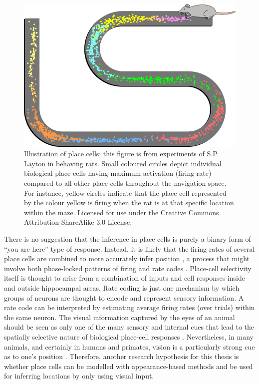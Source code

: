 \begin{figure}[!t]
\centering
\includegraphics[width=.6\linewidth]{./gfx/Chapter01/bio_place_cells_rat.png}
\caption{Illustration of place cells; this figure is from experiments of S.P. Layton in behaving rats. Small coloured circles depict individual biological place-cells having maximum activation (firing rate) compared to all other place cells throughout the navigation space. For instance, yellow circles indicate that the place cell represented by the colour yellow is firing when the rat is at that specific location within the maze. Licensed for use under the Creative Commons Attribution\--Share\-A\-like 3.0 License.}
\label{fig:Maze}
\end{figure}

There is no suggestion that the inference in place cells is purely a binary form of ``you are here'' type of response.  Instead, it is likely that the firing rates of several place cells are combined to more accurately infer position \cite{hafting2005microstructure}, a process that might involve both phase-locked patterns of firing and rate codes \cite{dragoi2006temporal}. Place-cell selectivity itself is thought to arise from a combination of inputs and cell responses inside and outside hippocampal areas. Rate coding \cite{van2001rate} is just one mechanism by which groups of neurons are thought to encode and represent sensory information. A rate code can be interpreted by estimating average firing rates (over trials) within the same neuron. 
The visual information captured by the eyes of an animal should be seen as only one of the many sensory and internal cues that lead to the spatially selective nature of biological place-cell responses \cite{hassabis2009decoding}. Nevertheless, in many animals, and certainly in humans and primates, vision is a particularly strong cue as to one's position \cite{epstein1998cortical}. Therefore, another research hypothesis for this thesis is whether place cells can be modelled with appearance-based methods and be used for inferring locations by only using visual input.


